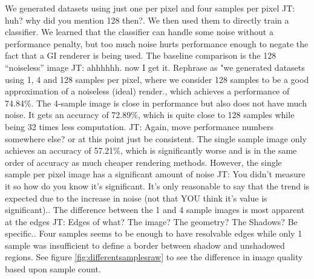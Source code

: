 \documentclass[10pt,twocolumn,letterpaper]{article}
\newcommand{\tompson}[1]{{\color{green} JT: #1}}
\begin{document}
We generated datasets using just one per pixel and four samples per pixel \tompson{huh? why did you mention 128 then?}. We then used them to directly train a classifier.  We learned that the classifier can handle some noise without a performance penalty,  but too much noise hurts performance enough to negate the fact that a GI renderer is being used.  The baseline comparison is the 128 ``noiseless'' image \tompson{ahhhhhh. now I get it. Rephrase as "we generated datasets using 1, 4 and 128 samples per pixel, where we consider 128 samples to be a good approximation of a noiseless (ideal) render.}, which achieves a performance of 74.84\%.  The 4-sample image is close in performance but also does not have much noise.  It gets an accuracy of 72.89\%, which is quite close to 128 samples while being 32 times less computation.  \tompson{Again, move performance numbers somewhere else? or at this point just be consistent.} The single sample image only achieves an accuracy of 57.21\%, which is significantly worse and is in the same order of accuracy as much cheaper rendering methods. However, the single sample per pixel image has a significant amount of noise \tompson{You didn't measure it so how do you know it's significant. It's only reasonable to say that the trend is expected due to the increase in noise (not that YOU think it's value is significant).}.  The difference between the 1 and 4 sample images is most apparent at the edges \tompson{Edges of what? The image? The geometry? The Shadows? Be specific.}. Four samples seems to be enough to have resolvable edges while only 1 sample was insufficient to define a border between shadow and unshadowed regions. See figure \ref{fig:differentsamplesraw} to see the difference in image quality based upon sample count. 

\end{document}

